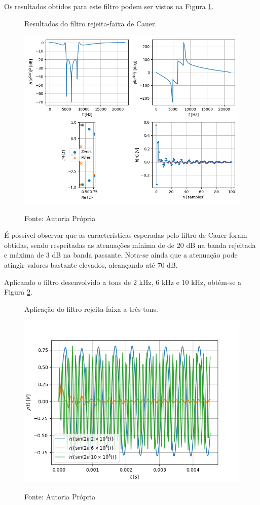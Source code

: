 \documentclass[12pt,a4paper]{report}
\begin{document}
  Os resultados obtidos para este filtro podem ser vistos na Figura \ref{fig:cauer_results}.
  \begin{figure}[H]
    \caption{Resultados do filtro rejeita-faixa de Cauer.}
    \centering
    \includegraphics[width=\textwidth]{images/cauer_results}
    \label{fig:cauer_results}
    \caption*{Fonte: Autoria Própria}
  \end{figure}

  É possível observar que as características esperadas pelo filtro de Cauer foram obtidas, sendo respeitadas
  as atenuações mínima de de 20 dB na banda rejeitada e máxima de 3 dB na banda passante. Nota-se ainda que
  a atenuação pode atingir valores bastante elevados, alcançando até 70 dB.

  Aplicando o filtro desenvolvido a tons de 2 kHz, 6 kHz e 10 kHz, obtém-se a Figura \ref{fig:cauer_tones}.
  \begin{figure}[H]
    \caption{Aplicação do filtro rejeita-faixa a três tons.}
    \centering
    \includegraphics[width=\textwidth]{images/cauer_tones}
    \label{fig:cauer_tones}
    \caption*{Fonte: Autoria Própria}
  \end{figure}
\end{document}
